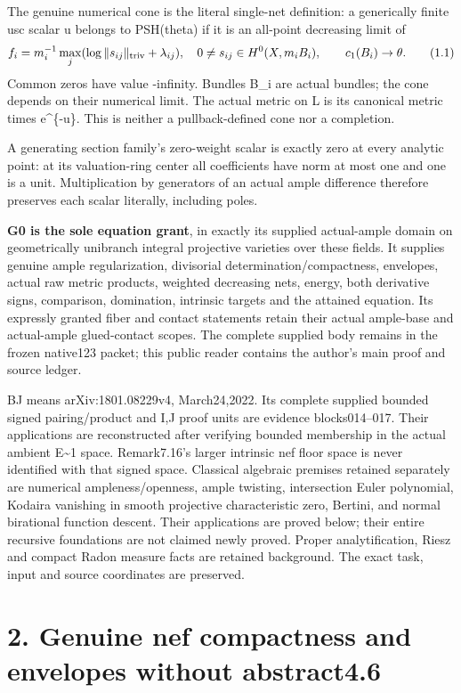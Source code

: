 \documentclass[
  10pt,
]{article}
\begin{document}
The genuine numerical cone is the literal single-net definition: a
generically finite usc scalar u belongs to PSH(theta) if it is an
all-point decreasing limit of \[
 f_i=m_i^{-1}\max_j(\log\|s_{ij}\|_{\rm triv}+\lambda_{ij}),\quad
 0\ne s_{ij}\in H^0(X,m_iB_i),\qquad c_1(B_i)\to\theta.                 \tag{1.1}
\] Common zeros have value -infinity. Bundles B\_i are actual bundles;
the cone depends on their numerical limit. The actual metric on L is its
canonical metric times e\^{}\{-u\}. This is neither a pullback-defined
cone nor a completion.

A generating section family's zero-weight scalar is exactly zero at
every analytic point: at its valuation-ring center all coefficients have
norm at most one and one is a unit. Multiplication by generators of an
actual ample difference therefore preserves each scalar literally,
including poles.

\textbf{G0 is the sole equation grant}, in exactly its supplied
actual-ample domain on geometrically unibranch integral projective
varieties over these fields. It supplies genuine ample regularization,
divisorial determination/compactness, envelopes, actual raw metric
products, weighted decreasing nets, energy, both derivative signs,
comparison, domination, intrinsic targets and the attained equation. Its
expressly granted fiber and contact statements retain their actual
ample-base and actual-ample glued-contact scopes. The complete supplied
body remains in the frozen native123 packet; this public reader contains
the author's main proof and source ledger.

BJ means arXiv:1801.08229v4, March24,2022. Its complete supplied bounded
signed pairing/product and I,J proof units are evidence blocks014--017.
Their applications are reconstructed after verifying bounded membership
in the actual ambient E\textasciitilde1 space. Remark7.16's larger
intrinsic nef floor space is never identified with that signed space.
Classical algebraic premises retained separately are numerical
ampleness/openness, ample twisting, intersection Euler polynomial,
Kodaira vanishing in smooth projective characteristic zero, Bertini, and
normal birational function descent. Their applications are proved below;
their entire recursive foundations are not claimed newly proved. Proper
analytification, Riesz and compact Radon measure facts are retained
background. The exact task, input and source coordinates are preserved.

\section{2. Genuine nef compactness and envelopes without
abstract4.6}\label{genuine-nef-compactness-and-envelopes-without-abstract4.6}
\end{document}
